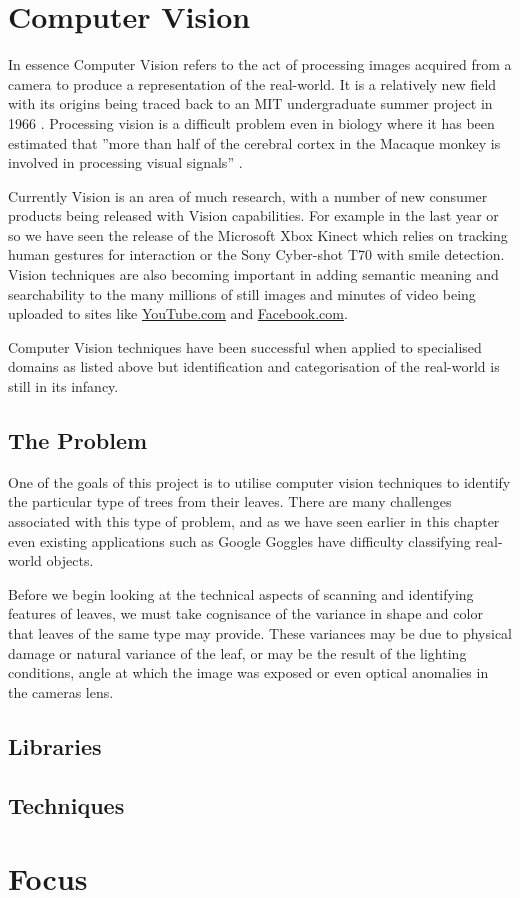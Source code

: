 \section{Computer Vision}
In essence Computer Vision refers to the act of processing images acquired from a camera to produce a representation of the real-world.  It is a relatively new field with its origins being traced back to an MIT undergraduate summer project in 1966 \cite{feili10}. Processing vision is a difficult problem even in biology where it has been estimated that ”more than half of the cerebral cortex in the Macaque monkey is involved in processing visual signals” \cite{wilson99}.

Currently Vision is an area of much research, with a number of new consumer products being released with Vision capabilities. For example in the last year or so we have seen the release of the Microsoft Xbox Kinect which relies on tracking human gestures for interaction or the Sony Cyber-shot T70 with smile detection.  Vision techniques are also becoming important in adding semantic meaning and searchability to the many millions of still images and minutes of video being uploaded to sites like \url{YouTube.com} and \url{Facebook.com}. 

Computer Vision techniques have been successful when applied to specialised domains as listed above but identification and categorisation of the real-world is still in its infancy.

\subsection{The Problem}
One of the goals of this project is to utilise computer vision techniques to identify the particular type of trees from their leaves. There are many challenges associated with this type of problem, and as we have seen earlier in this chapter even existing applications such as Google Goggles have difficulty classifying real-world objects.

Before we begin looking at the technical aspects of scanning and identifying features of leaves, we must take cognisance of the variance in shape and color that leaves of the same type may provide. These variances may be due to physical damage or natural variance of the leaf, or may be the result of the lighting conditions, angle at which the image was exposed or even optical anomalies in the cameras lens.

\subsection{Libraries}

\subsection{Techniques}

\section{Focus}
